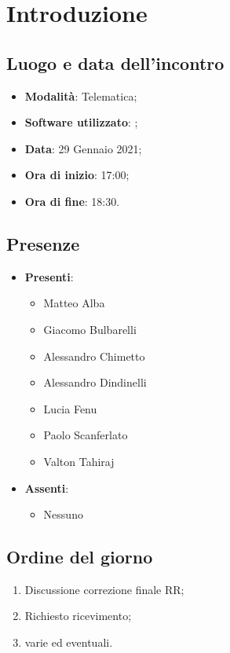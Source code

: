 \documentclass[]{article}
\begin{document}
	
	
	
	\newpage
	
	
		\section{Introduzione}
		\subsection{Luogo e data dell'incontro}
		\begin{itemize}
			\item \textbf{Modalità}: Telematica;
			\item \textbf{Software utilizzato}: ;
			\item \textbf{Data}: 29 Gennaio 2021;
			\item \textbf{Ora di inizio}: 17:00;
			\item \textbf{Ora di fine}: 18:30.
		\end{itemize}

		\subsection{Presenze}
		\begin{itemize}
			\item \textbf{Presenti}:
			\begin{itemize}
				\item Matteo Alba
				\item Giacomo Bulbarelli
				\item Alessandro Chimetto
				\item Alessandro Dindinelli
				\item Lucia Fenu
				\item Paolo Scanferlato
				\item Valton Tahiraj
			\end{itemize}
			\item \textbf{Assenti}:
			\begin{itemize}
				\item Nessuno
			\end{itemize}
		\end{itemize}


		\subsection{Ordine del giorno}
		\begin{enumerate}
			\item Discussione correzione finale RR;
			\item Richiesto ricevimento;
			\item varie ed eventuali.
		\end{enumerate}
\end{document}
